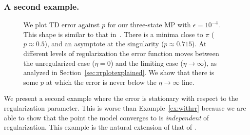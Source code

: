 \subsubsection{A second example. }\label{sec:withrr2}
\begin{figure}
	
	\caption{We plot TD error against $p$ for our three-state MP with $\epsilon=10^{-4}$. This shape is similar to that in~\cite{kolter2011fixed}. There is a minima close to $\pi$ ($p\approx 0.5$), and an asymptote at the singularity ($p\approx 0.715$). At different levels of regularization the error function moves between the unregularized case ($\eta=0$) and the limiting case ($\eta\to\infty$), as analyzed in Section~\ref{sec:rrplotexplained}. We show that there is some $p$ at which the error is never below the $\eta\to\infty$ line. }
	\label{fig:fixedpointp}
\end{figure}

We present a second example where the error is stationary with respect to the regularization parameter. This is worse than Example~\ref{ex:withrr} because we are able to show that the point the model converges to is \emph{independent} of regularization. This example is the natural extension of that of \citet{kolter2011fixed}.

